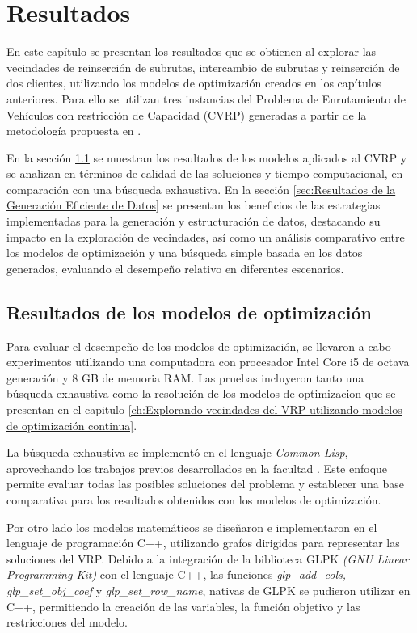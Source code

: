\documentclass[12pt]{report}
\begin{document}
\chapter{Resultados}
\label{ch:Resultados}
En este capítulo se presentan los resultados que se obtienen al explorar las vecindades de reinserción de subrutas, intercambio de subrutas y reinserción de dos clientes, utilizando los modelos de optimización creados en los capítulos anteriores. Para ello se utilizan tres instancias del Problema de Enrutamiento de Vehículos con restricción de Capacidad (CVRP) generadas a partir de la metodología propuesta en \cite{ref12}.

En la sección \ref{sec:Resultados de los modelos de optimización} se muestran los resultados de los modelos aplicados al CVRP y se analizan en términos de calidad de las soluciones y tiempo computacional, en comparación con una búsqueda exhaustiva. En la sección \ref{sec:Resultados de la Generación Eficiente de Datos} se presentan los beneficios de las estrategias implementadas para la generación y estructuración de datos, destacando su impacto en la exploración de vecindades, así como un análisis comparativo entre los modelos de optimización y una búsqueda simple basada en los datos generados, evaluando el desempeño relativo en diferentes escenarios.

\section{Resultados de los modelos de optimización}
\label{sec:Resultados de los modelos de optimización}

Para evaluar el desempeño de los modelos de optimización, se llevaron a cabo experimentos utilizando una computadora con procesador Intel Core i5 de octava generación y 8 GB de memoria RAM. Las pruebas incluyeron tanto una búsqueda exhaustiva como la resolución de los modelos de optimizacion que se presentan en el capitulo \ref{ch:Explorando vecindades del VRP utilizando modelos de optimización continua}.

La búsqueda exhaustiva se implementó en el lenguaje \textit{Common Lisp}, aprovechando los trabajos previos desarrollados en la facultad \cite{ref18,ref3,ref4,ref5,ref6}. Este enfoque permite evaluar todas las posibles soluciones del problema y establecer una base comparativa para los resultados obtenidos con los modelos de optimización.

Por otro lado los modelos matemáticos se diseñaron e implementaron en el lenguaje de programación C++, utilizando grafos dirigidos para representar las soluciones del VRP. Debido a la integración de la biblioteca GLPK \textit{(GNU Linear Programming Kit)} con el lenguaje C++, las funciones \textit{glp\_add\_cols, glp\_set\_obj\_coef} y \textit{glp\_set\_row\_name}, nativas de GLPK se pudieron utilizar en C++, permitiendo la creación de las variables, la función objetivo y las restricciones del modelo.
\end{document}
